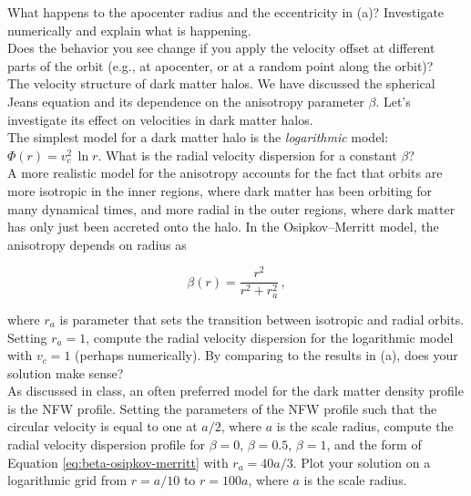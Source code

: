 \documentclass[12pt]{article}
\begin{document}
 What happens to the apocenter radius and the
eccentricity in (a)? Investigate numerically and explain what is
happening.\\

 Does the behavior you see change if you apply the
velocity offset at different parts of the orbit (e.g., at apocenter,
or at a random point along the orbit)?\\

 The velocity structure of dark matter
halos. We have discussed the spherical Jeans equation and its
dependence on the anisotropy parameter $\beta$. Let's investigate its
effect on velocities in dark matter halos.\\

 The simplest model for a dark matter halo is the
\emph{logarithmic} model: $\Phi(r) = v^2_c\,\ln r$. What is the radial
velocity dispersion for a constant $\beta$?\\

 A more realistic model for the anisotropy accounts
for the fact that orbits are more isotropic in the inner regions, where
dark matter has been orbiting for many dynamical times, and more
radial in the outer regions, where dark matter has only just been
accreted onto the halo. In the Osipkov--Merritt model, the anisotropy depends on radius as

\begin{equation}\label{eq:beta-osipkov-merritt}
  \beta(r) = \frac{r^2}{r^2+r_a^2}\,,
\end{equation}

where $r_a$ is parameter that sets the transition between isotropic
and radial orbits. Setting $r_a = 1$, compute the radial velocity
dispersion for the logarithmic model with $v_c = 1$ (perhaps
numerically). By comparing to the results in (a), does your solution
make sense?\\

 As discussed in class, an often preferred model for
the dark matter density profile is the NFW profile. Setting the
parameters of the NFW profile such that the circular velocity is equal
to one at $a/2$, where $a$ is the scale radius, compute the radial
velocity dispersion profile for $\beta = 0$, $\beta = 0.5$, $\beta =
1$, and the form of Equation \eqref{eq:beta-osipkov-merritt} with $r_a
= 40a/3$. Plot your solution on a logarithmic grid from $r = a/10$ to
$r=100a$, where $a$ is the scale radius.
\end{document}
